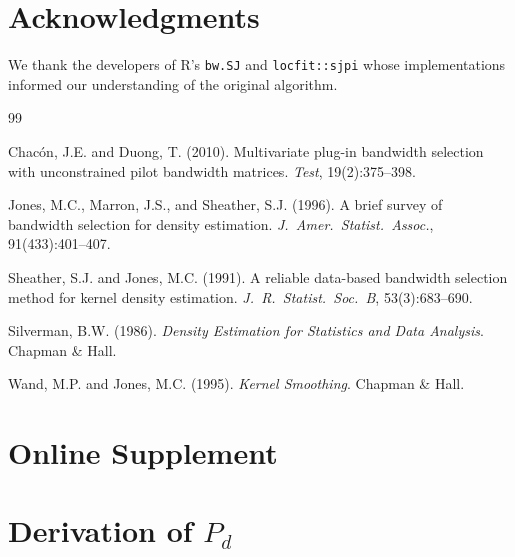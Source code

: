 \documentclass[12pt]{article}
\begin{document}
\section*{Acknowledgments}
We thank the developers of R's \texttt{bw.SJ} and \texttt{locfit::sjpi} whose implementations informed our understanding of the original algorithm.


\begin{thebibliography}{99}

Chac\'on, J.E. and Duong, T. (2010). Multivariate plug-in bandwidth selection with unconstrained pilot bandwidth matrices. \textit{Test}, 19(2):375--398.

Jones, M.C., Marron, J.S., and Sheather, S.J. (1996). A brief survey of bandwidth selection for density estimation. \textit{J.~Amer.~Statist.~Assoc.}, 91(433):401--407.

Sheather, S.J. and Jones, M.C. (1991). A reliable data-based bandwidth selection method for kernel density estimation. \textit{J.~R.~Statist.~Soc.~B}, 53(3):683--690.

Silverman, B.W. (1986). \textit{Density Estimation for Statistics and Data Analysis}. Chapman \& Hall.

Wand, M.P. and Jones, M.C. (1995). \textit{Kernel Smoothing}. Chapman \& Hall.

\end{thebibliography}

\newpage
\appendix
\section*{Online Supplement}
\setcounter{section}{0}
\renewcommand{\thesection}{S\arabic{section}}

\section{Derivation of $P_d$}
\label{sec:supp_Pd}
\end{document}
